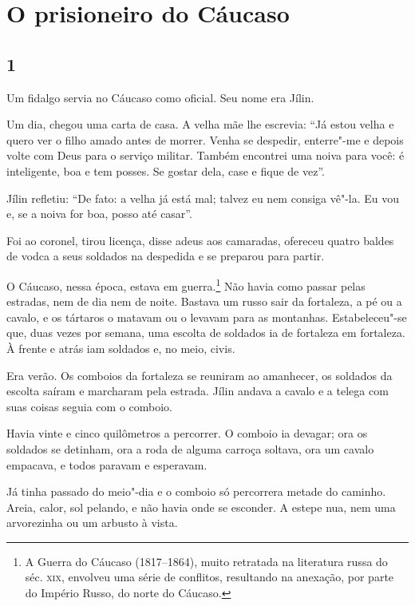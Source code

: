 \chapter[O prisioneiro do Cáucaso]{O prisioneiro do Cáucaso} \label{part4}

\section{1}

\noindent{}Um fidalgo servia no Cáucaso como oficial. Seu nome era Jílin.

Um dia, chegou uma carta de casa. A velha mãe lhe escrevia: ``Já estou
velha e quero ver o filho amado antes de morrer. Venha se despedir,
enterre"-me e depois volte com Deus para o serviço militar. Também
encontrei uma noiva para você: é inteligente, boa e tem posses. Se gostar dela, case e fique de vez''.

Jílin refletiu: ``De fato: a velha já está mal; talvez eu nem consiga
vê"-la. Eu vou e, se a noiva for boa, posso até casar''.

Foi ao coronel, tirou licença, disse adeus aos camaradas, ofereceu
quatro baldes de vodca a seus soldados na despedida e se preparou para
partir.

O Cáucaso, nessa época, estava em guerra.\footnote{A Guerra do Cáucaso
  (1817--1864), muito retratada na literatura russa do séc. \textsc{xix},
  envolveu uma série de conflitos, resultando na anexação, por parte do
  Império Russo, do norte do Cáucaso.} Não havia como passar pelas
estradas, nem de dia nem de noite. Bastava um russo sair da fortaleza, a
pé ou a cavalo, e os tártaros o matavam ou o levavam para as montanhas.
Estabeleceu"-se que, duas vezes por semana, uma escolta de soldados ia de
fortaleza em fortaleza. À frente e atrás iam soldados e, no meio, civis.

Era verão. Os comboios da fortaleza se reuniram ao amanhecer, os
soldados da escolta saíram e marcharam pela estrada. Jílin andava a
cavalo e a telega com suas coisas seguia com o comboio.

Havia vinte e cinco quilômetros a percorrer. O comboio ia devagar; ora
os soldados se detinham, ora a roda de alguma carroça soltava, ora um
cavalo empacava, e todos paravam e esperavam.

Já tinha passado do meio"-dia e o comboio só percorrera metade do
caminho. Areia, calor, sol pelando, e não havia onde se esconder. A
estepe nua, nem uma arvorezinha ou um arbusto à vista.

